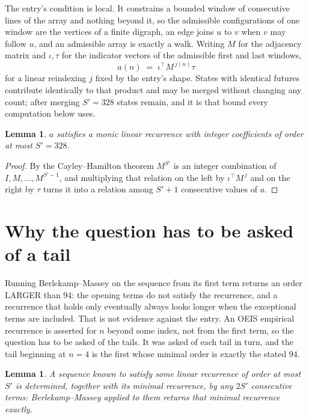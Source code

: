 \documentclass[11pt,a4paper]{article}
\theoremstyle{plain}
\newtheorem{lemma}[theorem]{Lemma}
\theoremstyle{definition}
\begin{document}
The entry's condition is local. It constrains a bounded window of consecutive lines of the
array and nothing beyond it, so the admissible configurations of one window are the vertices of
a finite digraph, an edge joins $u$ to $v$ when $v$ may follow $u$, and an admissible array is
exactly a walk. Writing $M$ for the adjacency matrix and $\iota,\tau$ for the indicator vectors
of the admissible first and last windows,
\[
a(n)\;=\;\iota^{\!\top}M^{\,j(n)}\tau
\]
for a linear reindexing $j$ fixed by the entry's shape. States with identical futures
contribute identically to that product and may be merged without changing any count; after
merging $S'=328$ states remain, and it is that bound every computation below uses.

\begin{lemma}\label{lem:cf}
$a$ satisfies a monic linear recurrence with integer coefficients of order at most $S'=328$.
\end{lemma}

\begin{proof}
By the Cayley--Hamilton theorem $M^{S'}$ is an integer combination of $I,M,\dots,M^{S'-1}$,
and multiplying that relation on the left by $\iota^{\!\top}M^{\,j}$ and on the right by
$\tau$ turns it into a relation among $S'+1$ consecutive values of $a$.
\end{proof}

\section{Why the question has to be asked of a tail}

Running Berlekamp--Massey on the sequence from its first term returns an order LARGER than $94$: the opening terms do not satisfy the recurrence, and a recurrence that holds only eventually always looks longer when the exceptional terms are included. That is not evidence against the entry. An OEIS empirical recurrence is asserted for $n$ beyond some index, not from the first term, so the question has to be asked of the tails. It was asked of each tail in turn, and the tail beginning at $n=4$ is the first whose minimal order is exactly the stated $94$.

\begin{lemma}\label{lem:bm}
A sequence known to satisfy some linear recurrence of order at most $S'$ is determined,
together with its minimal recurrence, by any $2S'$ consecutive terms: Berlekamp--Massey applied
to them returns that minimal recurrence exactly.
\end{lemma}
\end{document}
